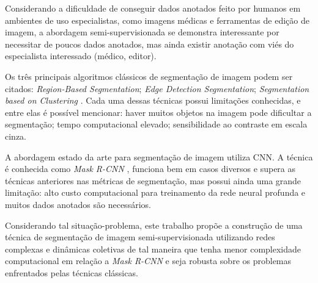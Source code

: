 Considerando a dificuldade de conseguir dados anotados feito por
humanos em ambientes de uso especialistas, como imagens médicas e
ferramentas de edição de imagem, a abordagem semi-supervisionada se
demonstra interessante por necessitar de poucos dados anotados, mas ainda
existir anotação com viés do especialista interessado (médico,
editor).

Os três principais algoritmos clássicos de segmentação de imagem podem
ser citados: \textit{Region-Based Segmentation}; \textit{Edge Detection
  Segmentation}; \textit{Segmentation based on Clustering}
\cite{ImageSegmentationTechniques1985}. Cada uma dessas técnicas
possui limitações conhecidas, e entre elas é possível mencionar: haver
muitos objetos na imagem pode dificultar a segmentação; tempo
computacional elevado; sensibilidade ao contraste em escala cinza.

A abordagem estado da arte para segmentação de imagem utiliza
\gls{CNN}. A técnica é conhecida como \textit{Mask R-CNN}
\cite{he2018mask}, funciona bem em casos diversos e supera as técnicas
anteriores nas métricas de segmentação, mas possui ainda uma grande
limitação: alto custo computacional para treinamento da rede neural
profunda e muitos dados anotados são necessários.

Considerando tal situação-problema, este trabalho propõe a construção
de uma técnica de segmentação de imagem semi-supervisionada utilizando
redes complexas e dinâmicas coletivas de tal maneira que tenha menor
complexidade computacional em relação a \textit{Mask R-CNN} e seja
robusta sobre os problemas enfrentados pelas técnicas clássicas.

